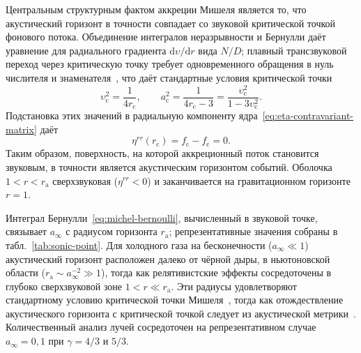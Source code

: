 \documentclass[12pt,a4paper,preprint]{elsarticle}
\begin{document}
            Центральным структурным фактом аккреции Мишеля является то, что акустический горизонт в точности совпадает со звуковой критической точкой фонового потока. Объединение интегралов неразрывности и Бернулли даёт уравнение для радиального градиента $\mathrm{d}\upsilon/\mathrm{d}r$ вида $N/D$; плавный трансзвуковой переход через критическую точку требует одновременного обращения в нуль числителя и знаменателя~\cite{ShapiroSL_TeukolskySA_BlackHolesWhiteDwarfsAndNeutronStarsThePhysicsOfCompactObjects_2004}, что даёт стандартные условия критической точки
            \begin{equation}
                \upsilon^{2}_{\mathrm{c}} = \frac{1}{4r_{\mathrm{c}}} , \qquad a^{2}_{\mathrm{c}} = \frac{1}{4r_{\mathrm{c}}-3} = \frac{\upsilon^{2}_{\mathrm{c}}}{1-3\upsilon^{2}_{\mathrm{c}}} .
                \label{eq:michel-sonic}
            \end{equation}
            Подстановка этих значений в радиальную компоненту ядра~\eqref{eq:eta-contravariant-matrix} даёт
            \begin{equation}
                \eta^{rr}(r_{\mathrm{c}}) = f_{\mathrm{c}} - f_{\mathrm{c}} = 0 .
                \label{eq:sonic-is-horizon}
            \end{equation}
            Таким образом, поверхность, на которой аккреционный поток становится звуковым, в точности является акустическим горизонтом событий. Оболочка $1<r<r_{\mathrm{a}}$ сверхзвуковая ($\eta^{rr}<0$) и заканчивается на гравитационном горизонте $r=1$.

            Интеграл Бернулли~\eqref{eq:michel-bernoulli}, вычисленный в звуковой точке, связывает $a_{\infty}$ с радиусом горизонта $r_{\mathrm{a}}$; репрезентативные значения собраны в табл.~\ref{tab:sonic-point}. Для холодного газа на бесконечности ($a_{\infty}\ll 1$) акустический горизонт расположен далеко от чёрной дыры, в ньютоновской области ($r_{\mathrm{a}}\sim a^{-2}_{\infty}\gg 1$), тогда как релятивистские эффекты сосредоточены в глубоко сверхзвуковой зоне $1<r\ll r_{\mathrm{a}}$. Эти радиусы удовлетворяют стандартному условию критической точки Мишеля~\cite{MichelFC_AccretionOfMatterByCondensedObjects_1972, ShapiroSL_TeukolskySA_BlackHolesWhiteDwarfsAndNeutronStarsThePhysicsOfCompactObjects_2004}, тогда как отождествление акустического горизонта с критической точкой следует из акустической метрики~\cite{MoncriefV_StabilityOfStationarySphericalAccretionOntoASchwarzschildBlackHole_1980, BilicN_RelativisticAcousticGeometry_1999}. Количественный анализ лучей сосредоточен на репрезентативном случае $a_{\infty}=0{,}1$ при $\gamma=4/3$ и $5/3$.
\end{document}
